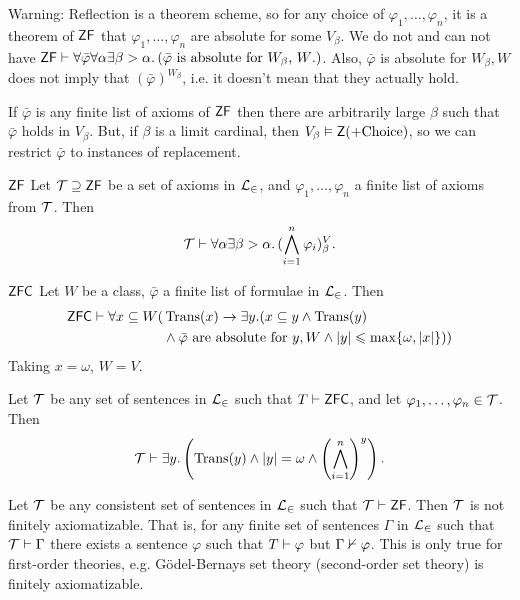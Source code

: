 \documentclass{article}
\begin{document}
Warning: Reflection is a theorem scheme, so for any choice of $\varphi_{1}, \dots, \varphi_{n}$, it is a theorem of $\mathsf{ZF}$ that $\varphi_{1},\dots, \varphi_{n}$ are absolute for some $V_{\beta}$. We do not and can not have $\mathsf{ZF} \vdash \forall \bar{\varphi} \forall \alpha \exists \beta > \alpha. \, (\bar{\varphi} \text{ is  absolute for $W_{\beta}$, $W$.})$. \gap
Also, $\bar{\varphi}$ is absolute for $W_{\beta}, W$ does not imply that $(\bar{\varphi})^{W_{\beta}}$, i.e. it doesn't mean that they actually hold.
\begin{remark}
    If $\bar{\varphi}$ is any finite list of axioms of $\mathsf{ZF}$ then there are arbitrarily large $\beta$ such that $\bar{\varphi}$ holds in $V_{\beta}$. But, if $\beta$ is a limit cardinal, then $V_{\beta} \vDash \mathsf{Z} (+ \text{Choice})$, so we can restrict $\bar{\varphi}$ to instances of replacement.
\end{remark}
\begin{corr}{$\mathsf{ZF}$}
    Let $\mathcal{T} \supseteq \mathsf{ZF}$ be a set of axioms in $\mathcal{L}_{\in}$, and $\varphi_{1}, \dots, \varphi_{n}$ a finite list of axioms from $\mathcal{T}$. Then \[\mathcal{T} \vdash \forall \alpha \exists \beta > \alpha. \, (\bigwedge_{i=1}^{n} \varphi_{i})^V_{\beta}.\]
\end{corr}
\begin{corr}{$\mathsf{ZFC}$}
    Let $W$ be a class, $\bar{\varphi}$ a finite list of formulae in $\mathcal{L}_{\in}$. Then \begin{align*} \mathsf{ZFC} \vdash \forall x \subseteq W ( & \operatorname{Trans}(x) \rightarrow \exists y. (x \subseteq y \wedge \operatorname{Trans}(y)                           \\
                                                      & \wedge \bar{\varphi} \text{ are absolute for $y,W$} \wedge |y| \leqslant \max\{ \omega ,|x|\}))\end{align*}
    Taking $x=\omega$, $W=V$.
\end{corr}
\begin{corr}{}
    Let $\mathcal{T}$ be any set of sentences in $\mathcal{L}_{\in}$ such that $T \vdash \mathsf{ZFC}$, and let $\varphi_{1}, \dots, \varphi_{n} \in \mathcal{T}$. Then \[\mathcal{T} \vdash \exists y. \left(\operatorname{Trans}(y) \wedge |y| = \omega \wedge \left( \bigwedge_{i=1}^{n} \right)^{y}\right).\]
\end{corr}
\begin{corr}{}
    Let $\mathcal{T}$ be any consistent set of sentences in $\mathcal{L}_{\in}$ such that $\mathcal{T} \vdash \mathsf{ZF}$. Then $\mathcal{T}$ is not finitely axiomatizable. That is, for any finite set of sentences $\Gamma$ in $\mathcal{L}_{\in}$ such that $\mathcal{T} \vdash \Gamma$ there exists a sentence $\varphi$ such that $T \vdash \varphi$ but $\Gamma \nvdash \varphi$.
    This is only true for first-order theories, e.g. G\"odel-Bernays set theory (second-order set theory) is finitely axiomatizable.
\end{corr}
\end{document}

